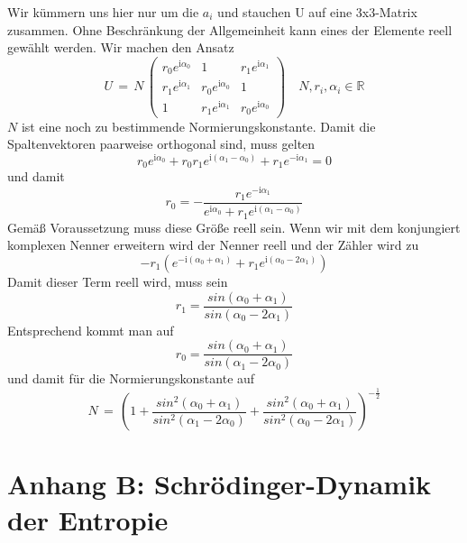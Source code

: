 \documentclass[12pt]{article}
\begin{document}
Wir kümmern uns hier nur um die $a_i$ und stauchen U auf eine 3x3-Matrix zusammen. Ohne Beschränkung der Allgemeinheit kann eines der Elemente reell gewählt werden. Wir machen den Ansatz
\begin{equation*}
U\, =\, N \, 
\begin{pmatrix}
r_0 e^{\mathrm i\alpha_0} & 1 & r_1 e^{\mathrm i\alpha_1} \\
r_1 e^{\mathrm i\alpha_1} & r_0 e^{\mathrm i\alpha_0} & 1 \\
1 & r_1 e^{\mathrm i\alpha_1} & r_0 e^{\mathrm i\alpha_0}
\end{pmatrix}
\quad N, r_i, \alpha_i \in \mathbb{R}
\end{equation*}
$N$ ist eine noch zu bestimmende Normierungskonstante. Damit die Spaltenvektoren paarweise orthogonal sind, muss gelten
\begin{equation*}
r_0 e^{\mathrm  i\alpha_0} + r_0 r_1 e^{\mathrm i(\alpha_1 - \alpha_0)} + r_1 e^{- \mathrm  i\alpha_1} = 0
\end{equation*}
und damit 
\begin{equation*}
r_0 = - \frac{r_1 e^{-\mathrm i\alpha_1}}{ e^{\mathrm i\alpha_0} + r_1 e^{\mathrm i(\alpha_1 - \alpha_0)} }
\end{equation*}
Gemäß Voraussetzung muss diese Größe reell sein. Wenn wir mit dem konjungiert komplexen Nenner erweitern wird der Nenner reell und der Zähler wird zu
\begin{equation*}
-r_1 \left( e^{-\mathrm i(\alpha_0+\alpha_1)} + r_1 e^{\mathrm i(\alpha_0-2\alpha_1)} \right)
\end{equation*}
Damit dieser Term reell wird, muss sein
\begin{equation*}
r_1=\frac{sin(\alpha_0+\alpha_1)}{sin(\alpha_0-2\alpha_1)}
\end{equation*}
Entsprechend kommt man auf 
\begin{equation*}
r_0=\frac{sin(\alpha_0+\alpha_1)}{sin(\alpha_1-2\alpha_0)}
\end{equation*}
und damit für die Normierungskonstante auf 
\begin{equation*}
N\, = \, \left( 1 +
\frac{sin^2(\alpha_0+\alpha_1)}{sin^2(\alpha_1-2\alpha_0)} +
\frac{sin^2(\alpha_0+\alpha_1)}{sin^2(\alpha_0-2\alpha_1)} \right)^{-\frac{1}{2}}
\end{equation*}

\section{Anhang B: Schrödinger-Dynamik der Entropie}
\end{document}
